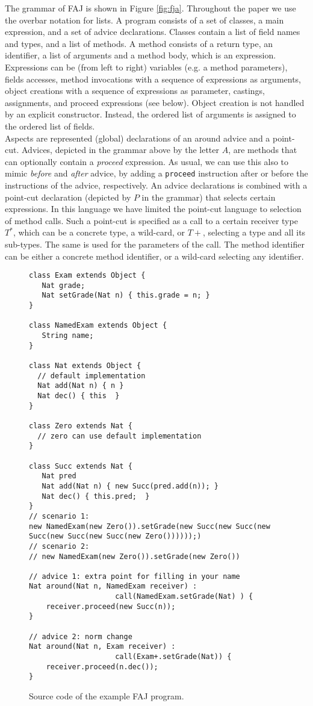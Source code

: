 The grammar of FAJ is shown in Figure \ref{fig:fja}. Throughout the paper we use the overbar notation for lists. A program consists of a set of classes, a main expression, and a set of advice declarations. Classes contain a list of field names and types, and a list of methods. A method consists of a return type, an identifier, a list of arguments and a method body, which is an expression. Expressions can be (from left to right) variables (e.g. a method parameters), fields accesses, method invocations with a sequence of expressions as arguments, object creations with a sequence of expressions as parameter, castings, assignments, and proceed expressions (see below). Object creation is not handled by an explicit constructor. Instead, the ordered list of arguments is assigned to the ordered list of fields.\\
Aspects are represented (global) declarations of an around advice and a point-cut. Advices, depicted in the grammar above by the letter $A$, are methods that can optionally contain a \emph{proceed} expression. As usual, we can use this also to mimic \emph{before} and \emph{after} advice, by adding a {\tt proceed} instruction after or before the instructions of the advice, respectively. An advice declarations is combined with a point-cut declaration (depicted by $P$ in the grammar) that selects certain expressions. In this language we have limited the point-cut language to selection of method calls. Such a point-cut is specified as a call to a certain receiver type $T^*$, which can be a concrete type, a wild-card, or $T+$, selecting a type and all its sub-types. The same is used for the parameters of the call. The method identifier can be either a concrete method identifier, or a wild-card selecting any identifier.\\

\begin{figure}[ht]
\begin{lstlisting}[language=FAJ]
class Exam extends Object {
   Nat grade;
   Nat setGrade(Nat n) { this.grade = n; }
}

class NamedExam extends Object {
   String name;
}

class Nat extends Object {
  // default implementation
  Nat add(Nat n) { n }
  Nat dec() { this  }
}

class Zero extends Nat {
  // zero can use default implementation 
}

class Succ extends Nat {
   Nat pred
   Nat add(Nat n) { new Succ(pred.add(n)); }
   Nat dec() { this.pred;  }
}
// scenario 1:
new NamedExam(new Zero()).setGrade(new Succ(new Succ(new Succ(new Succ(new Succ(new Zero())))));)
// scenario 2:
// new NamedExam(new Zero()).setGrade(new Zero())

// advice 1: extra point for filling in your name
Nat around(Nat n, NamedExam receiver) :
					call(NamedExam.setGrade(Nat) ) {
    receiver.proceed(new Succ(n));
}

// advice 2: norm change
Nat around(Nat n, Exam receiver) : 
					call(Exam+.setGrade(Nat)) {
    receiver.proceed(n.dec());
}
\end{lstlisting}
\caption{Source code of the example FAJ program.}
\label{fig:example}
\end{figure}

